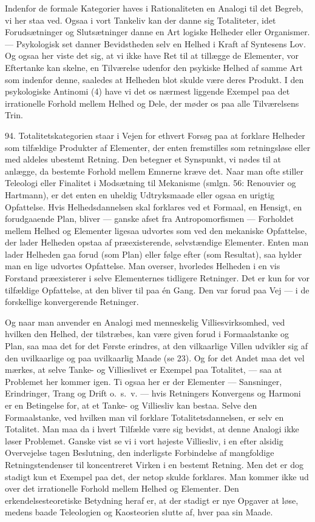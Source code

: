 \documentclass[12pt,a4paper]{book}
\newcommand{\apage}[1]{\marginnote{\footnotesize\textit{[#1]}}}
\begin{document}
Indenfor de formale Kategorier haves i Rationaliteten en Analogi til det Begreb, vi
her staa ved. Ogsaa i vort Tankeliv kan der danne sig Totaliteter, idet
Forudsætninger og Slutsætninger danne en Art logiske Helheder eller Organismer. ---
Psykologisk set danner Bevidstheden selv en Helhed i Kraft af Syntesens Lov. Og
ogsaa her viste det sig, at vi ikke have Ret til at tillægge de Elementer, vor
Eftertanke kan skelne, en Tilværelse udenfor den psykiske Helhed af samme Art som
indenfor denne, saaledes at Helheden blot skulde være deres Produkt. I den
psykologiske Antinomi (4) have vi det os nærmest liggende Exempel paa det
irrationelle Forhold mellem Helhed og Dele, der møder os paa alle Tilværelsens
Trin.

94. Totalitetskategorien staar i Vejen for ethvert Forsøg paa at forklare Helheder
som tilfældige Produkter af Elementer, der enten fremstilles som retningsløse eller
med aldeles ubestemt Retning. Den betegner et Synspunkt, vi nødes til at anlægge,
da bestemte Forhold mellem Emnerne kræve det. Naar man ofte stiller Teleologi eller
Finalitet i Modsætning til Mekanisme (smlgn. 56: Renouvier og Hartmann), er det
enten en uheldig Udtryksmaade eller ogsaa en urigtig Opfattelse. Hvis
Helhedsdannelsen skal forklares ved et Formaal, en Hensigt, en forudgaaende Plan,
bliver --- ganske afset fra Antropomorfismen --- Forholdet mellem Helhed og
Elementer ligesaa udvortes som ved den mekaniske Opfattelse, der lader Helheden
opstaa af præexisterende, selvstændige Elementer. Enten man lader Helheden gaa
forud (som Plan) eller følge efter (som Resultat), saa hylder man en lige udvortes
Opfattelse. Man overser, hvorledes Helheden i en vis Forstand præexisterer i selve
Elementernes tidligere Retninger. Det er kun for vor tilfældige Opfattelse, at den \apage{222}
bliver til paa én Gang. Den var forud paa Vej --- i de forskellige konvergerende
Retninger.

Og naar man anvender en Analogi med menneskelig Villiesvirksomhed, ved hvilken den
Helhed, der tilstræbes, kan være given forud i Formaalstanke og Plan, saa maa det
for det Første erindres, at den vilkaarlige Villen udvikler sig af den uvilkaarlige
og paa uvilkaarlig Maade (se 23). Og for det Andet maa det vel mærkes, at selve
Tanke- og Villieslivet er Exempel paa Totalitet, --- saa at Problemet her kommer
igen. Ti ogsaa her er der Elementer --- Sansninger, Erindringer, Trang og Drift
o.\ s.\ v. --- hvis Retningers Konvergens og Harmoni er en Betingelse for, at et
Tanke- og Villiesliv kan bestaa. Selve den Formaalstanke, ved hvilken man vil
forklare Totalitetsdannelsen, er selv en Totalitet. Man maa da i hvert Tilfælde
være sig bevidst, at denne Analogi ikke løser Problemet. Ganske vist se vi i vort højeste Villiesliv, i en efter alsidig Overvejelse tagen Beslutning, den inderligste
Forbindelse af mangfoldige Retningstendenser til koncentreret Virken i en bestemt
Retning. Men det er dog stadigt kun et Exempel paa det, der netop skulde forklares.
Man kommer ikke ud over det irrationelle Forhold mellem Helhed og Elementer. Den
erkendelsesteoretiske Betydning heraf er, at der stadigt er nye Opgaver at løse,
medens baade Teleologien og Kaosteorien slutte af, hver paa sin Maade.
\end{document}
